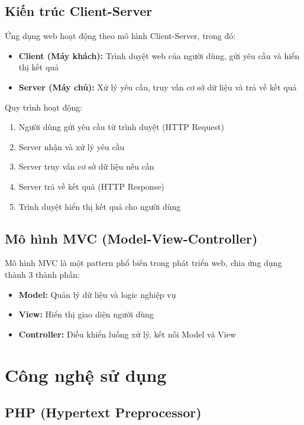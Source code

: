 \documentclass[13pt,a4paper]{extreport}
\begin{document}
\subsection{Kiến trúc Client-Server}

Ứng dụng web hoạt động theo mô hình Client-Server, trong đó:

\begin{itemize}
    \item \textbf{Client (Máy khách):} Trình duyệt web của người dùng, gửi yêu cầu và hiển thị kết quả
    \item \textbf{Server (Máy chủ):} Xử lý yêu cầu, truy vấn cơ sở dữ liệu và trả về kết quả
\end{itemize}

Quy trình hoạt động:
\begin{enumerate}
    \item Người dùng gửi yêu cầu từ trình duyệt (HTTP Request)
    \item Server nhận và xử lý yêu cầu
    \item Server truy vấn cơ sở dữ liệu nếu cần
    \item Server trả về kết quả (HTTP Response)
    \item Trình duyệt hiển thị kết quả cho người dùng
\end{enumerate}

\subsection{Mô hình MVC (Model-View-Controller)}

Mô hình MVC là một pattern phổ biến trong phát triển web, chia ứng dụng thành 3 thành phần:

\begin{itemize}
    \item \textbf{Model:} Quản lý dữ liệu và logic nghiệp vụ
    \item \textbf{View:} Hiển thị giao diện người dùng
    \item \textbf{Controller:} Điều khiển luồng xử lý, kết nối Model và View
\end{itemize}

\section{Công nghệ sử dụng}

\subsection{PHP (Hypertext Preprocessor)}
\end{document}
